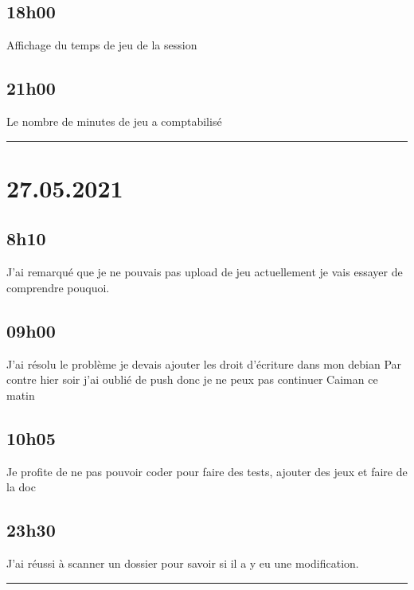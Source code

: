 \documentclass[a4paper,12pt,french]{sphinxmanual}
\begin{document}
\subsection{18h00}
\label{\detokenize{logbook:id161}}
\sphinxAtStartPar
Affichage du temps de jeu de la session


\subsection{21h00}
\label{\detokenize{logbook:id162}}
\sphinxAtStartPar
Le nombre de minutes de jeu a comptabilisé


\bigskip\hrule\bigskip



\section{27.05.2021}
\label{\detokenize{logbook:id163}}

\subsection{8h10}
\label{\detokenize{logbook:id164}}
\sphinxAtStartPar
J’ai remarqué que je ne pouvais pas upload de jeu actuellement je vais essayer de comprendre pouquoi.


\subsection{09h00}
\label{\detokenize{logbook:id165}}
\sphinxAtStartPar
J’ai résolu le problème je devais ajouter les droit d’écriture dans mon debian
Par contre hier soir j’ai oublié de push donc je ne peux pas continuer Caiman ce matin


\subsection{10h05}
\label{\detokenize{logbook:id166}}
\sphinxAtStartPar
Je profite de ne pas pouvoir coder pour faire des tests, ajouter des jeux et faire de la doc


\subsection{23h30}
\label{\detokenize{logbook:id167}}
\sphinxAtStartPar
J’ai réussi à scanner un dossier pour savoir si il a y eu une modification.


\bigskip\hrule\bigskip
\end{document}
